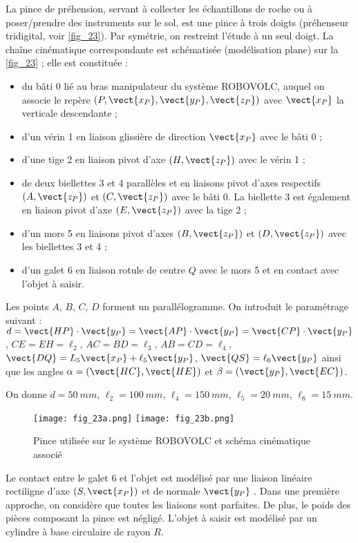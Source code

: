 La pince de préhension, servant à collecter les échantillons de roche ou à poser/prendre des
instruments sur le sol, est une pince à trois doigts (préhenseur tridigital, voir \autoref{fig_23}). Par
symétrie, on restreint l'étude à un seul doigt.
La chaîne cinématique correspondante est schématisée (modélisation plane) sur la \autoref{fig_23} ; elle
est constituée :
\begin{itemize}
\item du bâti 0 lié au bras manipulateur du système ROBOVOLC, auquel on associe le repère $\left(P,\vect{x_P},\vect{y_P},\vect{z_P}\right)$ avec
$\vect{x_P}$ la verticale descendante ;
\item  d'un vérin 1 en liaison glissière de direction $\vect{x_P}$ avec le bâti 0 ;
\item  d'une tige 2 en liaison pivot d'axe $\left(H,\vect{z_P}\right)$ avec le vérin 1 ;
\item  de deux biellettes 3 et 4 parallèles et en liaisons pivot d'axes respectifs $\left(A,\vect{z_P}\right)$ et $\left(C,\vect{z_P}\right)$
avec le bâti 0. La biellette 3 est également en liaison pivot d'axe $\left(E,\vect{z_P}\right)$ avec la tige 2 ;
\item  d'un mors 5 en liaisons pivot d'axes $\left(B,\vect{z_P}\right)$ et $\left(D,\vect{z_P}\right)$ avec les biellettes 3 et 4 ;
\item  d'un galet 6 en liaison rotule de centre $Q$ avec le mors 5 et en contact avec l'objet à saisir.
\end{itemize}
Les points $A$, $B$, $C$, $D$ forment un parallélogramme. On introduit le paramétrage suivant :
$d=\vect{HP} \cdot \vect{y_P}=\vect{AP} \cdot \vect{y_P}=\vect{CP} \cdot \vect{y_P}$, 
$CE = EH = \ell_2$, 
$AC = BD = \ell_3$,
$AB = CD = \ell_4$,
$\vect{DQ} = L_5\vect{x_P} + \ell_5 \vect{y_P}$, 
$\vect{QS} = \ell_6\vect{y_P}$
ainsi que les angles
$\alpha = \left(\vect{HC},\vect{HE}\right)$
et  $\beta = \left(\vect{y_P},\vect{EC}\right)$.

On donne $d = \SI{50}{mm}$, $\ell_2 =\SI{100}{mm}$, $\ell_4 =\SI{150}{mm}$, $\ell_5 =\SI{20}{mm}$, $\ell_6 =\SI{15}{mm}$.

\begin{figure}[H]
\centering
\texttt{[image: fig\_23a.png]}
\texttt{[image: fig\_23b.png]}
\caption{Pince utilisée sur le système ROBOVOLC et schéma cinématique associé \label{fig_23}}
\end{figure}


Le contact entre le galet 6 et l'objet est modélisé par une liaison linéaire rectiligne d'axe $\left(S,\vect{x_P}\right)$ et
de normale $\vect{y_P}$ .
Dans une première approche, on considère que toutes les liaisons sont parfaites. De plus, le poids
des pièces composant la pince est négligé.
L'objet à saisir est modélisé par un cylindre à base circulaire de rayon $R$.
\fi



